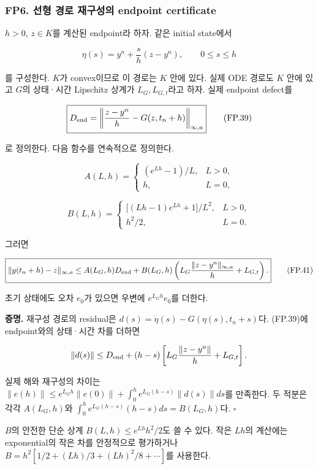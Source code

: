 \hypertarget{fp6.-uxc120uxd615-uxacbduxb85c-uxc7acuxad6cuxc131uxc758-endpoint-certificate}{%
\subsubsection{FP6. 선형 경로 재구성의 endpoint certificate}\label{fp6.-uxc120uxd615-uxacbduxb85c-uxc7acuxad6cuxc131uxc758-endpoint-certificate}}

\(h>0\), \(z\in K\)를 계산된 endpoint라 하자. 같은 initial state에서

\[
\eta(s)=y^n+\frac{s}{h}(z-y^n),\qquad 0\le s\le h
\tag{FP.38}
\]

를 구성한다. \(K\)가 convex이므로 이 경로는 \(K\) 안에 있다. 실제 ODE 경로도 \(K\) 안에 있고 \(G\)의 상태·시간 Lipschitz 상계가 \(L_G,L_{G,t}\)라고 하자. 실제 endpoint defect를

\[
\boxed{
D_{\rm end}
=
\left\|
\frac{z-y^n}{h}-G(z,t_n+h)
\right\|_{\infty,a}
}
\tag{FP.39}
\]

로 정의한다. 다음 함수를 연속적으로 정의한다.

\[
A(L,h)=
\begin{cases}
(e^{Lh}-1)/L,&L>0,\\
h,&L=0,
\end{cases}
\]

\[
B(L,h)=
\begin{cases}
\bigl[(Lh-1)e^{Lh}+1\bigr]/L^2,&L>0,\\
h^2/2,&L=0 .
\end{cases}
\tag{FP.40}
\]

그러면

\[
\boxed{
\|y(t_n+h)-z\|_{\infty,a}
\le
A(L_G,h)D_{\rm end}
+
B(L_G,h)
\left(
L_G\frac{\|z-y^n\|_{\infty,a}}h+L_{G,t}
\right).
}
\tag{FP.41}
\]

초기 상태에도 오차 \(e_0\)가 있으면 우변에 \(e^{L_Gh}e_0\)를 더한다.

\textbf{증명.} 재구성 경로의 residual은 \(d(s)=\dot\eta(s)-G(\eta(s),t_n+s)\)다. (FP.39)에 endpoint와의 상태·시간 차를 더하면

\[
\|d(s)\|
\le D_{\rm end}
+(h-s)
\left[
L_G\frac{\|z-y^n\|}h+L_{G,t}
\right].
\]

실제 해와 재구성의 차이는 \(\|e(h)\|\le e^{L_Gh}\|e(0)\|+\int_0^h e^{L_G(h-s)}\|d(s)\|ds\)를 만족한다. 두 적분은 각각 \(A(L_G,h)\)와 \(\int_0^h e^{L_G(h-s)}(h-s)ds=B(L_G,h)\)다. \(\square\)

\(B\)의 안전한 단순 상계 \(B(L,h)\le e^{Lh}h^2/2\)도 쓸 수 있다. 작은 \(Lh\)의 계산에는 exponential의 작은 차를 안정적으로 평가하거나 \(B=h^2[1/2+(Lh)/3+(Lh)^2/8+\cdots]\)를 사용한다.

